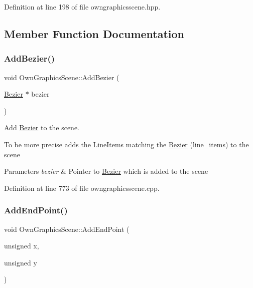 Definition at line 198 of file owngraphicsscene.\+hpp.



\subsection{Member Function Documentation}
\mbox{\label{classOwnGraphicsScene_ac0c5440d16675d6bf8c27767d2721622}} 
\subsubsection{\texorpdfstring{Add\+Bezier()}{AddBezier()}}
{\footnotesize\ttfamily void Own\+Graphics\+Scene\+::\+Add\+Bezier (\begin{DoxyParamCaption}\item[{\mbox{\hyperlink{classBezier}{Bezier}} $\ast$}]{bezier }\end{DoxyParamCaption})}



Add \mbox{\hyperlink{classBezier}{Bezier}} to the scene. 

To be more precise adds the Line\+Items matching the \mbox{\hyperlink{classBezier}{Bezier}} (line\+\_\+items) to the scene 
\begin{DoxyParams}{Parameters}
{\em bezier} & Pointer to \mbox{\hyperlink{classBezier}{Bezier}} which is added to the scene \\
\hline
\end{DoxyParams}


Definition at line 773 of file owngraphicsscene.\+cpp.

\mbox{\label{classOwnGraphicsScene_a64ce3afc4e535576fedbfe3f172cea0d}} 
\subsubsection{\texorpdfstring{Add\+End\+Point()}{AddEndPoint()}}
{\footnotesize\ttfamily void Own\+Graphics\+Scene\+::\+Add\+End\+Point (\begin{DoxyParamCaption}\item[{unsigned}]{x,  }\item[{unsigned}]{y }\end{DoxyParamCaption})}



